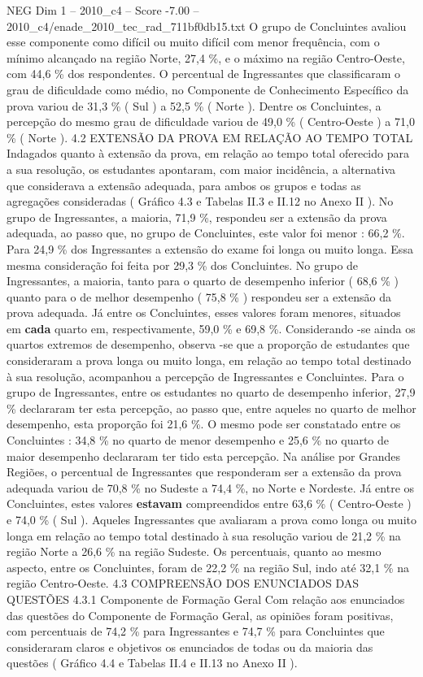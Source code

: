 \begin{textsample}{NEG Dim 1 – 2010\_c4 – Score -7.00 – 2010\_c4/enade\_2010\_tec\_rad\_711bf0db15.txt}
O grupo de Concluintes avaliou esse componente como difícil ou muito difícil com menor frequência, com o mínimo alcançado na região Norte, 27,4 \%, e o máximo na região Centro-Oeste, com 44,6 \% dos respondentes.
O percentual de Ingressantes que classificaram o grau de dificuldade como médio, no Componente de Conhecimento Específico da prova variou de 31,3 \% ( Sul ) a 52,5 \% ( Norte ).
Dentre os Concluintes, a percepção do mesmo grau de dificuldade variou de 49,0 \% ( Centro-Oeste ) a 71,0 \% ( Norte ). 4.2 EXTENSÃO DA PROVA EM RELAÇÃO AO TEMPO TOTAL Indagados quanto à extensão da prova, em relação ao tempo total oferecido para a sua resolução, os estudantes apontaram, com maior incidência, a alternativa que considerava a extensão adequada, para ambos os grupos e todas as agregações consideradas ( Gráfico 4.3 e Tabelas II.3 e II.12 no Anexo II ).
No grupo de Ingressantes, a maioria, 71,9 \%, respondeu ser a extensão da prova adequada, ao passo que, no grupo de Concluintes, este valor foi menor : 66,2 \%.
Para 24,9 \% dos Ingressantes a extensão do exame foi longa ou muito longa.
Essa mesma consideração foi feita por 29,3 \% dos Concluintes.
No grupo de Ingressantes, a maioria, tanto para o quarto de desempenho inferior ( 68,6 \% ) quanto para o de melhor desempenho ( 75,8 \% ) respondeu ser a extensão da prova adequada.
Já entre os Concluintes, esses valores foram menores, situados em \textbf{cada} quarto em, respectivamente, 59,0 \% e 69,8 \%.
Considerando -se ainda os quartos extremos de desempenho, observa -se que a proporção de estudantes que consideraram a prova longa ou muito longa, em relação ao tempo total destinado à sua resolução, acompanhou a percepção de Ingressantes e Concluintes.
Para o grupo de Ingressantes, entre os estudantes no quarto de desempenho inferior, 27,9 \% declararam ter esta percepção, ao passo que, entre aqueles no quarto de melhor desempenho, esta proporção foi 21,6 \%.
O mesmo pode ser constatado entre os Concluintes : 34,8 \% no quarto de menor desempenho e 25,6 \% no quarto de maior desempenho declararam ter tido esta percepção.
Na análise por Grandes Regiões, o percentual de Ingressantes que responderam ser a extensão da prova adequada variou de 70,8 \% no Sudeste a 74,4 \%, no Norte e Nordeste.
Já entre os Concluintes, estes valores \textbf{estavam} compreendidos entre 63,6 \% ( Centro-Oeste ) e 74,0 \% ( Sul ).
Aqueles Ingressantes que avaliaram a prova como longa ou muito longa em relação ao tempo total destinado à sua resolução variou de 21,2 \% na região Norte a 26,6 \% na região Sudeste.
Os percentuais, quanto ao mesmo aspecto, entre os Concluintes, foram de 22,2 \% na região Sul, indo até 32,1 \% na região Centro-Oeste. 4.3 COMPREENSÃO DOS ENUNCIADOS DAS QUESTÕES 4.3.1 Componente de Formação Geral Com relação aos enunciados das questões do Componente de Formação Geral, as opiniões foram positivas, com percentuais de 74,2 \% para Ingressantes e 74,7 \% para Concluintes que consideraram claros e objetivos os enunciados de todas ou da maioria das questões ( Gráfico 4.4 e Tabelas II.4 e II.13 no Anexo II ).

\end{textsample}
